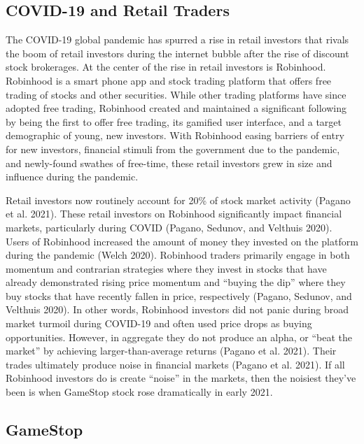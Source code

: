 \documentclass[12pt,]{article}
\begin{document}
\hypertarget{covid-19-and-retail-traders}{%
\subsection{COVID-19 and Retail
Traders}\label{covid-19-and-retail-traders}}

The COVID-19 global pandemic has spurred a rise in retail investors that
rivals the boom of retail investors during the internet bubble after the
rise of discount stock brokerages. At the center of the rise in retail
investors is Robinhood. Robinhood is a smart phone app and stock trading
platform that offers free trading of stocks and other securities. While
other trading platforms have since adopted free trading, Robinhood
created and maintained a significant following by being the first to
offer free trading, its gamified user interface, and a target
demographic of young, new investors. With Robinhood easing barriers of
entry for new investors, financial stimuli from the government due to
the pandemic, and newly-found swathes of free-time, these retail
investors grew in size and influence during the pandemic.

Retail investors now routinely account for 20\% of stock market activity
(Pagano et al. 2021). These retail investors on Robinhood significantly
impact financial markets, particularly during COVID (Pagano, Sedunov,
and Velthuis 2020). Users of Robinhood increased the amount of money
they invested on the platform during the pandemic (Welch 2020).
Robinhood traders primarily engage in both momentum and contrarian
strategies where they invest in stocks that have already demonstrated
rising price momentum and ``buying the dip'' where they buy stocks that
have recently fallen in price, respectively (Pagano, Sedunov, and
Velthuis 2020). In other words, Robinhood investors did not panic during
broad market turmoil during COVID-19 and often used price drops as
buying opportunities. However, in aggregate they do not produce an
alpha, or ``beat the market'' by achieving larger-than-average returns
(Pagano et al. 2021). Their trades ultimately produce noise in financial
markets (Pagano et al. 2021). If all Robinhood investors do is create
``noise'' in the markets, then the noisiest they've been is when
GameStop stock rose dramatically in early 2021.

\hypertarget{gamestop}{%
\subsection{GameStop}\label{gamestop}}
\end{document}
